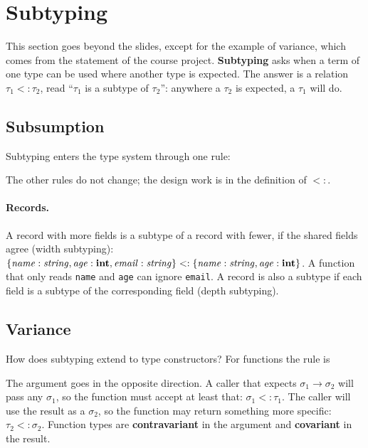 \section{Subtyping}
\label{sec:subtyping}

This section goes beyond the slides, except for the example of variance,
which comes from the statement of the course project. \textbf{Subtyping} asks
when a term of one type can be used where another type is expected. The
answer is a relation $\tau_1 <: \tau_2$, read ``$\tau_1$ is a subtype of
$\tau_2$'': anywhere a $\tau_2$ is expected, a $\tau_1$ will do.

\subsection{Subsumption}

Subtyping enters the type system through one rule:
\begin{mathpar}
\end{mathpar}
The other rules do not change; the design work is in the definition of $<:$.

\paragraph{Records.} A record with more fields is a subtype of a record with
fewer, if the shared fields agree (width subtyping):
$\{\mathit{name}: \mathit{string}, \mathit{age}: \mathbf{int}, \mathit{email}: \mathit{string}\} <:
\{\mathit{name}: \mathit{string}, \mathit{age}: \mathbf{int}\}$. A function that only reads
\texttt{name} and \texttt{age} can ignore \texttt{email}. A record is also a
subtype if each field is a subtype of the corresponding field (depth
subtyping).

\subsection{Variance}

How does subtyping extend to type constructors? For functions the rule is
\begin{mathpar}
\end{mathpar}
The argument goes in the opposite direction. A caller that expects
$\sigma_1 \to \sigma_2$ will pass any $\sigma_1$, so the function must accept at least
that: $\sigma_1 <: \tau_1$. The caller will use the result as a $\sigma_2$, so the
function may return something more specific: $\tau_2 <: \sigma_2$. Function types
are \textbf{contravariant} in the argument and \textbf{covariant} in the result.

